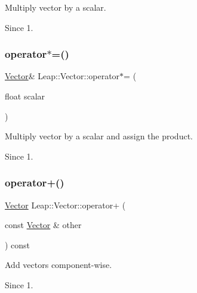 Multiply vector by a scalar.


\begin{DoxyCodeInclude}
\end{DoxyCodeInclude}
 \begin{DoxySince}{Since}
1. 
\end{DoxySince}
\mbox{\label{struct_leap_1_1_vector_a3c07a9eb80762ca448a78650500f06a8}} 
\subsubsection{\texorpdfstring{operator$\ast$=()}{operator*=()}}
{\footnotesize\ttfamily \hyperlink{struct_leap_1_1_vector}{Vector}\& Leap\+::\+Vector\+::operator$\ast$= (\begin{DoxyParamCaption}\item[{float}]{scalar }\end{DoxyParamCaption})\hspace{0.3cm}{\ttfamily [inline]}}

Multiply vector by a scalar and assign the product. \begin{DoxySince}{Since}
1. 
\end{DoxySince}
\mbox{\label{struct_leap_1_1_vector_a1d8bf3a008f4fa65c31ab63eaca825c7}} 
\subsubsection{\texorpdfstring{operator+()}{operator+()}}
{\footnotesize\ttfamily \hyperlink{struct_leap_1_1_vector}{Vector} Leap\+::\+Vector\+::operator+ (\begin{DoxyParamCaption}\item[{const \hyperlink{struct_leap_1_1_vector}{Vector} \&}]{other }\end{DoxyParamCaption}) const\hspace{0.3cm}{\ttfamily [inline]}}

Add vectors component-\/wise.


\begin{DoxyCodeInclude}
\end{DoxyCodeInclude}
 \begin{DoxySince}{Since}
1. 
\end{DoxySince}
\mbox{\label{struct_leap_1_1_vector_ac2dbd10e09399bc5679ceee380cff2cc}} 
